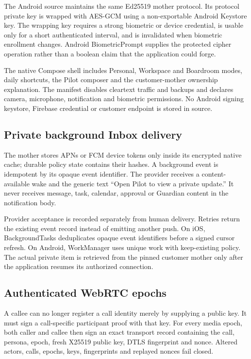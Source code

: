 The Android source maintains the same Ed25519 mother protocol.  Its protocol private
key is wrapped with AES-GCM using a non-exportable Android Keystore key.  The wrapping
key requires a strong biometric or device credential, is usable only for a short
authenticated interval, and is invalidated when biometric enrollment changes.
Android BiometricPrompt supplies the protected cipher operation rather than a boolean
claim that the application could forge.

The native Compose shell includes Personal, Workspace and Boardroom modes, daily
shortcuts, the Pilot composer and the customer-mother ownership explanation.  The
manifest disables cleartext traffic and backups and declares camera, microphone,
notification and biometric permissions.  No Android signing keystore, Firebase
credential or customer endpoint is stored in source.

\subsection{Private background Inbox delivery}

The mother stores APNs or FCM device tokens only inside its encrypted native cache;
durable policy state contains their hashes.  A background event is idempotent by its
opaque event identifier.  The provider receives a content-available wake and the
generic text ``Open Pilot to view a private update.''  It never receives message,
task, calendar, approval or Guardian content in the notification body.

Provider acceptance is recorded separately from human delivery.  Retries return the
existing event record instead of emitting another push.  On iOS, BackgroundTasks
deduplicates opaque event identifiers before a signed cursor refresh.  On Android,
WorkManager uses unique work with keep-existing policy.  The actual private item is
retrieved from the pinned customer mother only after the application resumes its
authorized connection.

\subsection{Authenticated WebRTC epochs}

A callee can no longer register a call identity merely by supplying a public key.  It
must sign a call-specific participant proof with that key.  For every media epoch,
both caller and callee then sign an exact transport record containing the call,
persona, epoch, fresh X25519 public key, DTLS fingerprint and nonce.  Altered actors,
calls, epochs, keys, fingerprints and replayed nonces fail closed.

